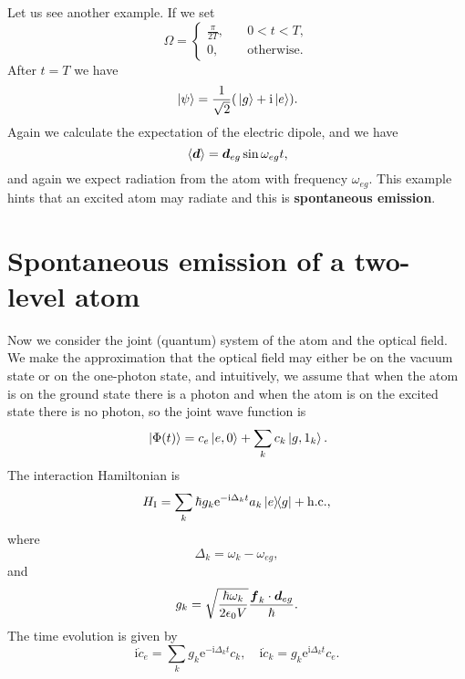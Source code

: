 \documentclass[hyperref, a4paper]{article}
\newcommand*{\ii}{\mathrm{i}}
\newcommand*{\ee}{\mathrm{e}}
\newcommand*{\concept}[1]{{\textbf{#1}}}
\begin{document}
Let us see another example. If we set 
\begin{equation}
    \Omega = \begin{cases}
        \frac{\pi}{2 T}, &\quad 0 < t < T, \\
        0,               &\quad \text{otherwise}.
    \end{cases}
\end{equation}
After $t = T$ we have 
\begin{equation}
    \ket*{\psi} = \frac{1}{\sqrt{2}} (\ket*{g} + \ii \ket*{e}).
\end{equation}
Again we calculate the expectation of the electric dipole, and we have 
\begin{equation}
    \expval*{\vb*{d}} = \vb*{d}_{eg} \sin \omega_{eg} t,
\end{equation}
and again we expect radiation from the atom with frequency $\omega_{eg}$.
This example hints that an excited atom may radiate and this is \concept{spontaneous emission}.

\section{Spontaneous emission of a two-level atom}

Now we consider the joint (quantum) system of the atom and the optical field.
We make the approximation that the optical field may either be on the vacuum state or on the one-photon state, 
and intuitively, we assume that when the atom is on the ground state there is a photon and when the atom is 
on the excited state there is no photon, so the joint wave function is
\begin{equation}
    \ket*{\Phi(t)} = c_e \ket*{e, 0} + \sum_{k} c_k \ket*{g, 1_k}.
\end{equation}
The interaction Hamiltonian is 
\begin{equation}
    H_\text{I} = \sum_k \hbar g_k \ee^{- \ii \Delta_k t} a_k \dyad*{e}{g} + \text{h.c.},
\end{equation}
where 
\begin{equation}
    \Delta_k = \omega_k - \omega_{eg},
\end{equation}
and
\begin{equation}
    g_k = \sqrt{\frac{\hbar \omega_k}{2 \epsilon_0 V}} \frac{\vb*{f}_k \cdot \vb*{d}_{eg}}{\hbar}.
\end{equation}
The time evolution is given by
\begin{equation}
    \ii \dot{c}_e = \sum_k g_k \ee^{- \ii \Delta_k t} c_k, \quad \ii \dot{c}_k = g_k \ee^{\ii \Delta_k t} c_e.
\end{equation}
\end{document}
